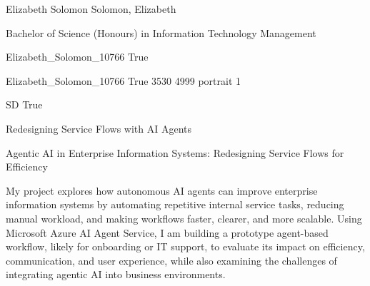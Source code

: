 \documentclass[twoside]{report}
\begin{document}
\begingroup{}\relax



\def\Key{Elizabeth_Solomon_10766}

{Elizabeth Solomon}
{Solomon, Elizabeth}

{Bachelor of Science (Honours) in Information Technology Management}

{Elizabeth_Solomon_10766}
{True}

{Elizabeth_Solomon_10766}
{True}
{3530}
{4999}
{portrait}
{1}

{SD}
{True}

{Redesigning Service Flows with AI Agents}

{Agentic AI in Enterprise Information Systems: Redesigning Service Flows for Efficiency}

{My project explores how autonomous AI agents can improve enterprise information systems by automating repetitive internal service tasks, reducing manual workload, and making workflows faster, clearer, and more scalable. Using Microsoft Azure AI Agent Service, I am building a prototype agent-based workflow, likely for onboarding or IT support, to evaluate its impact on efficiency, communication, and user experience, while also examining the challenges of integrating agentic AI into business environments.}
\end{document}
